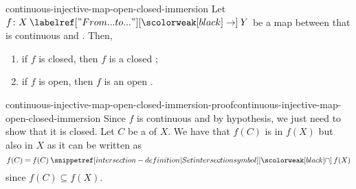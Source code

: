 \documentclass[preview]{standalone}
\begin{document}
\begin{snippetlemma}{continuous-injective-map-open-closed-immersion}{}
    Let \(f \colon X \fromto Y\)
    be a map between  that is continuous and \injective. Then,
    \begin{enumerate}
        \item if \(f\) is closed, then \(f\) is a closed \topologicalimmersion;
        \item if \(f\) is open, then \(f\) is an open \topologicalimmersion.
    \end{enumerate}
\end{snippetlemma}

\begin{snippetproof}{continuous-injective-map-open-closed-immersion-proof}{continuous-injective-map-open-closed-immersion}{}
    Since \(f\) is continuous and \injective by hypothesis, we just need to show that it is
    closed. Let \(C\) be a \closedset of \(X\).
    We have that \(f(C)\) is \closedset[closed] in \(f(X)\)
    but also in \(X\) as it can be written as \[
        f(C) = f(C) \intersection f(X)
    \]
    since \(f(C) \subseteq f(X)\).
\end{snippetproof}
\end{document}

